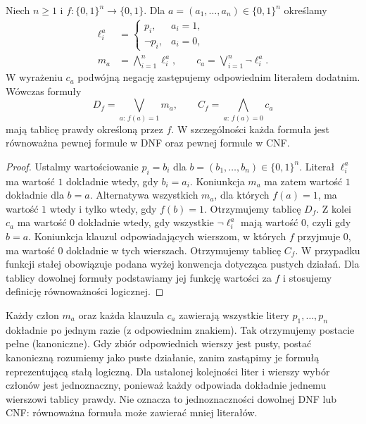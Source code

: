 \begin{twierdzenie}
\label{thm:lst-canonical-normal-forms}
Niech $n\geq1$ i $f:\{0,1\}^n\to\{0,1\}$.
Dla $a=(a_1,\ldots,a_n)\in\{0,1\}^n$ określamy
\[
\begin{split}
 \ell_i^a&=\begin{cases}p_i,&a_i=1,\\\neg p_i,&a_i=0,\end{cases}\\
 m_a&=\bigwedge_{i=1}^n\ell_i^a,\qquad
 c_a=\bigvee_{i=1}^n\neg\ell_i^a.
\end{split}
\]
W wyrażeniu $c_a$ podwójną negację zastępujemy
odpowiednim literałem dodatnim.
Wówczas formuły
\[
 D_f=\bigvee_{a:\,f(a)=1}m_a,\qquad
 C_f=\bigwedge_{a:\,f(a)=0}c_a
\]
mają tablicę prawdy określoną przez $f$. W szczególności
każda formuła jest równoważna pewnej formule w DNF
oraz pewnej formule w CNF.
\end{twierdzenie}
\begin{proof}
Ustalmy wartościowanie $p_i=b_i$ dla
$b=(b_1,\ldots,b_n)\in\{0,1\}^n$.
Literał $\ell_i^a$ ma wartość $1$ dokładnie wtedy,
gdy $b_i=a_i$. Koniunkcja $m_a$ ma zatem wartość $1$
dokładnie dla $b=a$. Alternatywa wszystkich $m_a$,
dla których $f(a)=1$, ma wartość $1$ wtedy i tylko wtedy,
gdy $f(b)=1$. Otrzymujemy tablicę $D_f$.
Z kolei $c_a$ ma wartość $0$ dokładnie wtedy,
gdy wszystkie $\neg\ell_i^a$ mają wartość $0$,
czyli gdy $b=a$. Koniunkcja klauzul odpowiadających
wierszom, w których $f$ przyjmuje $0$, ma wartość $0$
dokładnie w tych wierszach. Otrzymujemy tablicę $C_f$.
W przypadku funkcji stałej obowiązuje podana wyżej
konwencja dotycząca pustych działań. Dla tablicy
dowolnej formuły podstawiamy jej funkcję wartości
za $f$ i stosujemy definicję równoważności logicznej.
\end{proof}
Każdy człon $m_a$ oraz każda klauzula $c_a$ zawierają
wszystkie litery $p_1,\ldots,p_n$ dokładnie po jednym razie
(z odpowiednim znakiem). Tak otrzymujemy postacie pełne
(kanoniczne). Gdy zbiór odpowiednich wierszy jest pusty,
postać kanoniczną rozumiemy jako puste działanie, zanim
zastąpimy je formułą reprezentującą stałą logiczną.
Dla ustalonej kolejności liter i wierszy wybór członów
jest jednoznaczny, ponieważ każdy odpowiada dokładnie
jednemu wierszowi tablicy prawdy. Nie oznacza to
jednoznaczności dowolnej DNF lub CNF: równoważna
formuła może zawierać mniej literałów.

